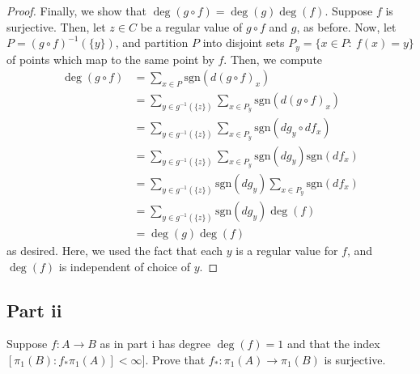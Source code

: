 \documentclass[fontsize=11pt]{scrartcl} %
\numberwithin{equation}{section} %
\numberwithin{figure}{section} %
\numberwithin{table}{section} %
\newcommand{\sgn}{\text{sgn}}
\begin{document}
\begin{proof}
    Finally, we show that $\deg(g\circ f) = \deg(g)\deg(f)$. Suppose $f$ is
    surjective. %
    Then, let $z\in C$ be a regular value of $g\circ f$ and $g$, as before.
    Now, let $P = (g\circ f)^{-1}(\{y\})$, and partition $P$ into disjoint sets
    $P_y = \{x\in P:\ f(x)=y\}$ of points which map to the same point by $f$.
    Then, we compute
    \[
        \begin{aligned}
            \deg(g\circ f) &= \sum_{x\in P}\sgn(d(g\circ f)_x)\\
            &=\sum_{y\in g^{-1}(\{z\})}\sum_{x\in P_y}\sgn(d(g\circ f)_x)\\
            &=\sum_{y\in g^{-1}(\{z\})}\sum_{x\in P_y}\sgn(dg_y\circ df_x)\\
        &=\sum_{y\in g^{-1}(\{z\})}\sum_{x\in P_y}\sgn(dg_y)\sgn(df_x)\\
        &=\sum_{y\in g^{-1}(\{z\})}\sgn(dg_y)\sum_{x\in P_y}\sgn(df_x)\\
        &=\sum_{y\in g^{-1}(\{z\})}\sgn(dg_y)\deg(f)\\
        &=\deg(g)\deg(f)
        \end{aligned}
    \]
    as desired. Here, we used the fact that each $y$ is a regular value for $f$,
    and $\deg(f)$ is independent of choice of $y$.
\end{proof}

\newpage

\subsection*{Part ii}
Suppose $f:A\to B$ as in part i has degree $\deg(f)=1$ and that the index
$[\pi_1(B):f_*\pi_1(A)]<\infty]$. Prove that $f_*:\pi_1(A)\to\pi_1(B)$ is
surjective.
\end{document}
